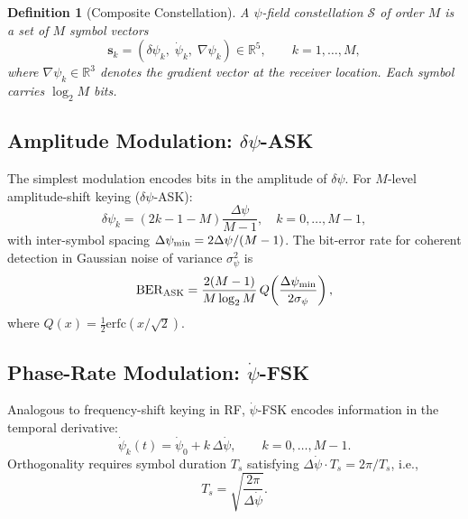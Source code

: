 \documentclass[twocolumn,superscriptaddress,prd,nofootinbib]{revtex4-2}
\newcommand{\BER}{\mathrm{BER}}
\newcommand{\erfc}{\mathrm{erfc}}
\newtheorem{definition}{Definition}
\begin{document}
\begin{definition}[Composite Constellation]
A $\psi$-field constellation $\mathcal{S}$ of order $M$ is a set of $M$
symbol vectors
\begin{equation}
\mathbf{s}_k = (\delta\psi_k,\;\dot{\psi}_k,\;\nabla\psi_k)
\in \mathbb{R}^5, \qquad k = 1,\ldots,M,
\label{eq:constellation}
\end{equation}
where $\nabla\psi_k \in \mathbb{R}^3$ denotes the gradient vector at
the receiver location.
Each symbol carries $\log_2 M$ bits.
\end{definition}

\subsection{Amplitude Modulation: $\delta\psi$-ASK}

The simplest modulation encodes bits in the amplitude of $\delta\psi$.
For $M$-level amplitude-shift keying ($\delta\psi$-ASK):
\begin{equation}
\delta\psi_k = \left(2k - 1 - M\right)\frac{\Delta\psi}{M-1}, \quad
k = 0,\ldots,M-1,
\label{eq:ASK}
\end{equation}
with inter-symbol spacing $\Delta\psi_{\rm min} = 2\Delta\psi/(M-1)$.
The bit-error rate for coherent detection in Gaussian noise of
variance $\sigma_\psi^2$ is
\begin{equation}
\BER_{\rm ASK} = \frac{2(M-1)}{M\log_2 M}\,Q\!\left(\frac{\Delta\psi_{\rm min}}{2\sigma_\psi}\right),
\label{eq:BER-ASK}
\end{equation}
where $Q(x) = \frac{1}{2}\erfc(x/\sqrt{2})$.

\subsection{Phase-Rate Modulation: $\dot{\psi}$-FSK}

Analogous to frequency-shift keying in RF, $\dot{\psi}$-FSK encodes
information in the temporal derivative:
\begin{equation}
\dot{\psi}_k(t) = \dot{\psi}_0 + k\,\Delta\dot{\psi},
\qquad k = 0,\ldots,M-1.
\label{eq:FSK}
\end{equation}
Orthogonality requires symbol duration $T_s$ satisfying
$\Delta\dot{\psi} \cdot T_s = 2\pi / T_s$, i.e.,
\begin{equation}
T_s = \sqrt{\frac{2\pi}{\Delta\dot{\psi}}}.
\label{eq:FSK-orthogonal}
\end{equation}
\end{document}
